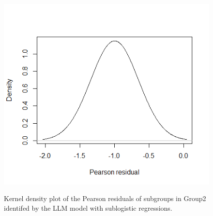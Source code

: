 \documentclass[11pt,onside,a4paper,fleqn]{report}
\begin{document}
\begin{figure}[htbp]
{      \includegraphics[scale=0.25]{figures/group2_3.png}\label{sublogisGroup2Subgroup3}
      }
      \caption{\small{Kernel density plot of the Pearson residuals of subgroups in Group2 identifed by the LLM model with sublogistic regressions.}}
      \end{figure}
\end{document}
